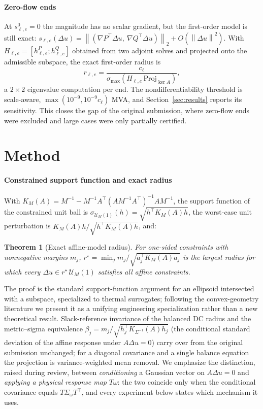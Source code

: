 \documentclass[11pt]{article}
\newtheorem{theorem}{Theorem}
\newcommand{\norm}[1]{\left\lVert #1 \right\rVert}
\newcommand{\Proj}{\mathrm{Proj}}
\begin{document}
\paragraph{Zero-flow ends}
At $s^0_{\ell,e}=0$ the magnitude has no scalar gradient, but the
first-order model is still exact:
$s_{\ell,e}(\Delta u)=\norm{(\nabla P^\top\Delta u,\ \nabla Q^\top\Delta
u)}_2+O(\norm{\Delta u}^2)$.  With $H_{\ell,e}=[h^P_{\ell,e};
h^Q_{\ell,e}]$ obtained from two adjoint solves and projected onto the
admissible subspace, the exact first-order radius is
\begin{equation}
  r_{\ell,e}
  =
  \frac{c_\ell}{\sigma_{\max}\!\left(H_{\ell,e}\,\Proj_{\ker A}\right)},
  \label{eq:opnorm}
\end{equation}
a $2\times2$ eigenvalue computation per end.  The nondifferentiability
threshold is scale-aware, $\max(10^{-9},10^{-9}c_\ell)$ MVA, and
Section~\ref{sec:results} reports its sensitivity.  This closes the gap of
the original submission, where zero-flow ends were excluded and large cases
were only partially certified.

\section{Method}
\label{sec:method}

\paragraph{Constrained support function and exact radius}
With $K_M(A)=M^{-1}-M^{-1}A^\top(AM^{-1}A^\top)^{-1}AM^{-1}$, the support
function of the constrained unit ball is
$\sigma_{\mathcal{U}_M(1)}(h)=\sqrt{h^\top K_M(A)h}$, the worst-case unit
perturbation is $K_M(A)h/\sqrt{h^\top K_M(A)h}$, and:

\begin{theorem}[Exact affine-model radius]
\label{thm:exact-radius}
For one-sided constraints with nonnegative margins $m_j$,
$r^\star=\min_j m_j/\sqrt{a_j^\top K_M(A)a_j}$ is the largest radius for
which every $\Delta u\in r^\star\,\mathcal{U}_M(1)$ satisfies all affine
constraints.
\end{theorem}

The proof is the standard support-function argument for an ellipsoid
intersected with a subspace, specialized to thermal surrogates; following
the convex-geometry literature we present it as a unifying engineering
specialization rather than a new theoretical result.  Slack-reference
invariance of the balanced DC radius and the metric--sigma equivalence
$\beta_j=m_j/\sqrt{h_j^\top K_{\Sigma^{-1}}(A)h_j}$ (the conditional
standard deviation of the affine response under $A\Delta u=0$) carry over
from the original submission unchanged; for a diagonal covariance and a
single balance equation the projection is variance-weighted mean removal.
We emphasize the distinction, raised during review, between
\emph{conditioning} a Gaussian vector on $A\Delta u=0$ and \emph{applying a
physical response map} $T\omega$: the two coincide only when the conditional
covariance equals $T\Sigma_\omega T^\top$, and every experiment below states
which mechanism it uses.
\end{document}
